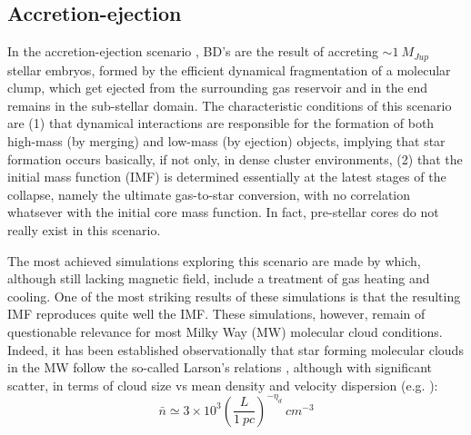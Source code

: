 \subsection {Accretion-ejection}
In the accretion-ejection scenario \citep{Reipurth2001}, BD’s are the result of accreting $\sim 1~M_{Jup}$ stellar
embryos, formed by the efficient dynamical fragmentation of a molecular clump, which get ejected from the surrounding 
gas reservoir and in the end remains in the sub-stellar domain. The characteristic conditions of this scenario are
(1) that dynamical interactions are responsible for the formation of both high-mass (by merging) and low-mass (by
ejection) objects, implying that star formation occurs basically, if not only, in dense cluster environments, 
(2) that the initial mass function (IMF) is determined essentially at the latest stages of the collapse, namely the ultimate gas-to-star conversion, with no correlation whatsever with the initial core mass function. 
In fact, pre-stellar cores do not really exist in this scenario.

The most achieved simulations exploring this scenario are made by \cite{Bate2012} which, although still
lacking magnetic field, include a treatment of gas heating and cooling. One of the most striking results of these 
simulations is that the resulting IMF reproduces quite well the \cite{Chabrier2005} IMF. These simulations, 
however, remain of questionable relevance for most Milky Way (MW) molecular cloud conditions. Indeed, it has been 
established observationally that star forming molecular clouds in the MW follow the so-called Larson’s relations \citep{Larson1981}, 
although with significant scatter, in terms of cloud size vs mean density and velocity dispersion 
(e.g. \citep{Hennebelle2012}): 
\begin{equation}
\bar{n} \simeq 3 \times 10^3 \left( \frac{L}{1~pc}\right)^{-\eta_d} ~cm^{-3}
\end{equation}


